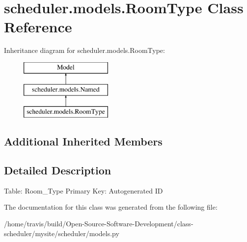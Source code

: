 \hypertarget{classscheduler_1_1models_1_1_room_type}{\section{scheduler.\-models.\-Room\-Type Class Reference}
\label{classscheduler_1_1models_1_1_room_type}
}
Inheritance diagram for scheduler.\-models.\-Room\-Type\-:\begin{figure}[H]
\begin{center}
\leavevmode
\includegraphics[height=3.000000cm]{classscheduler_1_1models_1_1_room_type}
\end{center}
\end{figure}
\subsection*{Additional Inherited Members}


\subsection{Detailed Description}
\begin{DoxyVerb}    Table: Room_Type
    Primary Key: Autogenerated ID
\end{DoxyVerb}
 

The documentation for this class was generated from the following file\-:\begin{DoxyCompactItemize}
\item 
/home/travis/build/\-Open-\/\-Source-\/\-Software-\/\-Development/class-\/scheduler/mysite/scheduler/models.\-py\end{DoxyCompactItemize}
